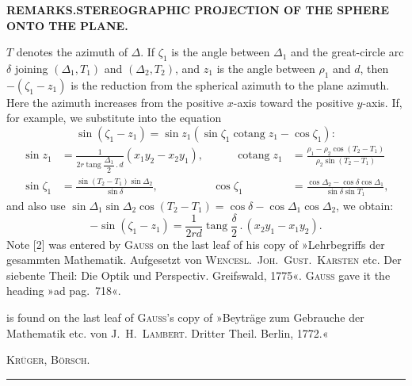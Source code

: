 \begingroup
\setlength{\abovedisplayskip}{7pt}
\setlength{\belowdisplayskip}{7pt}
\setlength{\abovedisplayshortskip}{3pt}
\setlength{\belowdisplayshortskip}{4pt}

\par\clearpage
\noindent{}\hfill{\fontsize{8}{10}\selectfont\textbf{REMARKS.\quad STEREOGRAPHIC PROJECTION OF THE SPHERE ONTO THE PLANE.}}\hfill\null\par\medskip

{\small
\noindent \(T\) denotes the azimuth of \(\Delta\). If \(\zeta_1\) is the angle between
\(\Delta_1\) and the great-circle arc \(\delta\) joining \((\Delta_1,T_1)\) and
\((\Delta_2,T_2)\), and \(z_1\) is the angle between \(\rho_1\) and \(d\),
then \(-(\zeta_1-z_1)\) is the reduction from the spherical azimuth to the plane azimuth.
Here the azimuth increases from the positive \(x\)-axis toward the positive \(y\)-axis.
If, for example, we substitute into the equation
\[
\sin(\zeta_1-z_1)=\sin z_1(\sin\zeta_1\operatorname{cotang}z_1-\cos\zeta_1):
\]
\[
\begin{alignedat}{2}
\sin z_1&=\frac1{2r\operatorname{tang}\dfrac{\Delta_1}2\,.\,d}(x_1y_2-x_2y_1),
&\qquad\operatorname{cotang}z_1&=\frac{\rho_1-\rho_2\cos(T_2-T_1)}{\rho_2\sin(T_2-T_1)}\\
\sin\zeta_1&=\frac{\sin(T_2-T_1)\sin\Delta_2}{\sin\delta},
&\cos\zeta_1&=\frac{\cos\Delta_2-\cos\delta\cos\Delta_1}{\sin\delta\sin T_1},
\end{alignedat}
\]
\noindent and also use
\(\sin\Delta_1\sin\Delta_2\cos(T_2-T_1)=\cos\delta-\cos\Delta_1\cos\Delta_2\), we obtain:
\[
-\sin(\zeta_1-z_1)=\frac1{2rd}\operatorname{tang}\frac{\delta}2\,.\,(x_2y_1-x_1y_2).
\]
Note [2] was entered by \textsc{Gauss} on the last leaf of his copy of
»Lehrbegriffs der gesammten Mathematik. Aufgesetzt von \textsc{Wencesl.\ Joh.\ Gust.\
Karsten} etc. Der siebente Theil: Die Optik und Perspectiv. Greifswald, 1775«.
\textsc{Gauss} gave it the heading »ad pag.\ 718«.
\par\noindent [3] is found on the last leaf of \textsc{Gauss}'s copy of
»Beyträge zum Gebrauche der Mathematik etc. von \textsc{J.\ H.\ Lambert.}
Dritter Theil. Berlin, 1772.«
\par
\noindent\hfill\textsc{Krüger, Börsch.}\hspace*{.06\linewidth}\par}
\vspace{2\baselineskip}
\begin{center}\rule{.24\linewidth}{.4pt}\end{center}


